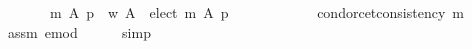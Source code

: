 \begin{isabellebody}
\ \ \ \ \ \ \ m\ A\ p\ {\isacharequal}{\kern0pt}\ {\isacharparenleft}{\kern0pt}{\isacharbraceleft}{\kern0pt}w{\isacharbraceright}{\kern0pt}{\isacharcomma}{\kern0pt}\ A\ {\isacharminus}{\kern0pt}\ elect\ m\ A\ p{\isacharcomma}{\kern0pt}\ {\isacharbraceleft}{\kern0pt}{\isacharbraceright}{\kern0pt}{\isacharparenright}{\kern0pt}\ {\isasymLongrightarrow}\isanewline
\ \ \ \ \ \ \ \ \ \ condorcet{\isacharunderscore}{\kern0pt}consistency\ m{\isachardoublequoteclose}\isanewline
\ \ \ \ \isamarkupfalse%
\ assm{}\ e{\isacharunderscore}{\kern0pt}mod\isanewline
\ \ \ \ \isamarkupfalse%
\ simp\isanewline
{}\isamarkupfalse%
%
\endisatagproof
{\isafoldproof}%
%
\isadelimproof
\isanewline
%
\endisadelimproof
%
\isadelimtheory
\isanewline
%
\endisadelimtheory
%
\isatagtheory
{}\isamarkupfalse%
%
\endisatagtheory
{\isafoldtheory}%
%
\isadelimtheory
%
\endisadelimtheory
%
\end{isabellebody}%
\endinput
